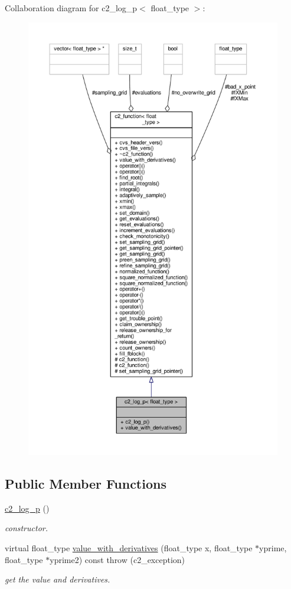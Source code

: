 Collaboration diagram for c2\+\_\+log\+\_\+p$<$ float\+\_\+type $>$\+:
\nopagebreak
\begin{figure}[H]
\begin{center}
\leavevmode
\includegraphics[height=550pt]{classc2__log__p__coll__graph}
\end{center}
\end{figure}
\subsection*{Public Member Functions}
\begin{DoxyCompactItemize}
\item 
\hyperlink{classc2__log__p_a53da98f4d84ed9d95352b3b06f7a7a55}{c2\+\_\+log\+\_\+p} ()
\begin{DoxyCompactList}\small\item\em constructor. \end{DoxyCompactList}\item 
virtual float\+\_\+type \hyperlink{classc2__log__p_acd98067684930659e4a47390385e56b3}{value\+\_\+with\+\_\+derivatives} (float\+\_\+type x, float\+\_\+type $\ast$yprime, float\+\_\+type $\ast$yprime2) const   throw (c2\+\_\+exception)
\begin{DoxyCompactList}\small\item\em get the value and derivatives. \end{DoxyCompactList}\end{DoxyCompactItemize}
